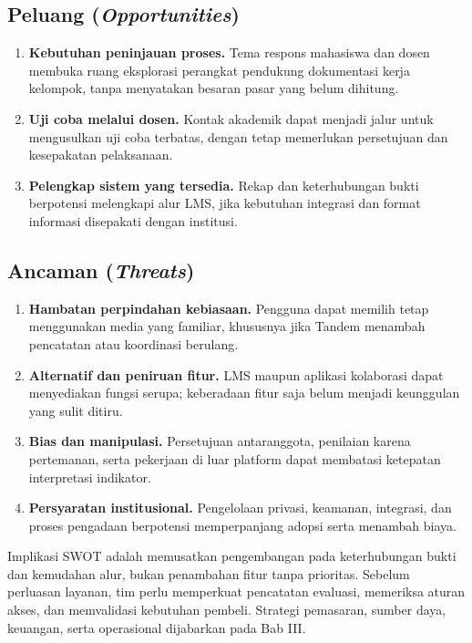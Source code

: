 \documentclass[12pt,a4paper,oneside]{report}
\begin{document}
\subsection{Peluang (\textit{Opportunities})}
\begin{enumerate}
\item \textbf{Kebutuhan peninjauan proses.} Tema respons mahasiswa dan dosen membuka ruang eksplorasi perangkat pendukung dokumentasi kerja kelompok, tanpa menyatakan besaran pasar yang belum dihitung.
\item \textbf{Uji coba melalui dosen.} Kontak akademik dapat menjadi jalur untuk mengusulkan uji coba terbatas, dengan tetap memerlukan persetujuan dan kesepakatan pelaksanaan.
\item \textbf{Pelengkap sistem yang tersedia.} Rekap dan keterhubungan bukti berpotensi melengkapi alur LMS, jika kebutuhan integrasi dan format informasi disepakati dengan institusi.
\end{enumerate}

\subsection{Ancaman (\textit{Threats})}
\begin{enumerate}
\item \textbf{Hambatan perpindahan kebiasaan.} Pengguna dapat memilih tetap menggunakan media yang familiar, khususnya jika Tandem menambah pencatatan atau koordinasi berulang.
\item \textbf{Alternatif dan peniruan fitur.} LMS maupun aplikasi kolaborasi dapat menyediakan fungsi serupa; keberadaan fitur saja belum menjadi keunggulan yang sulit ditiru.
\item \textbf{Bias dan manipulasi.} Persetujuan antaranggota, penilaian karena pertemanan, serta pekerjaan di luar platform dapat membatasi ketepatan interpretasi indikator.
\item \textbf{Persyaratan institusional.} Pengelolaan privasi, keamanan, integrasi, dan proses pengadaan berpotensi memperpanjang adopsi serta menambah biaya.
\end{enumerate}

Implikasi SWOT adalah memusatkan pengembangan pada keterhubungan bukti dan kemudahan alur, bukan penambahan fitur tanpa prioritas. Sebelum perluasan layanan, tim perlu memperkuat pencatatan evaluasi, memeriksa aturan akses, dan memvalidasi kebutuhan pembeli. Strategi pemasaran, sumber daya, keuangan, serta operasional dijabarkan pada Bab III.
\end{document}
